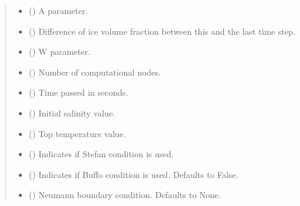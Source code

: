 \documentclass[a4paper,11pt,english,openany]{sphinxmanual}
\begin{document}
\begin{fulllineitems}
\begin{quote}
\begin{description}
\begin{itemize}
\item {} 
\sphinxAtStartPar
{} () \textendash{} A parameter.

\item {} 
\sphinxAtStartPar
{} () \textendash{} Difference of ice volume fraction between this and the last time step.

\item {} 
\sphinxAtStartPar
{} () \textendash{} W parameter.

\item {} 
\sphinxAtStartPar
{} () \textendash{} Number of computational nodes.

\item {} 
\sphinxAtStartPar
{} () \textendash{} Time passed in seconds.

\item {} 
\sphinxAtStartPar
{} () \textendash{} Initial salinity value.

\item {} 
\sphinxAtStartPar
{} () \textendash{} Top temperature value.

\item {} 
\sphinxAtStartPar
{} () \textendash{} Indicates if Stefan condition is used.

\item {} 
\sphinxAtStartPar
{} (\sphinxstyleliteralemphasis{\sphinxupquote{, }}) \textendash{} Indicates if Buffo condition is used. Defaults to False.

\item {} 
\sphinxAtStartPar
{} (\sphinxstyleliteralemphasis{\sphinxupquote{, }}) \textendash{} Neumann boundary condition. Defaults to None.


\end{itemize}
\end{description}
\end{quote}
\end{fulllineitems}
\end{document}
